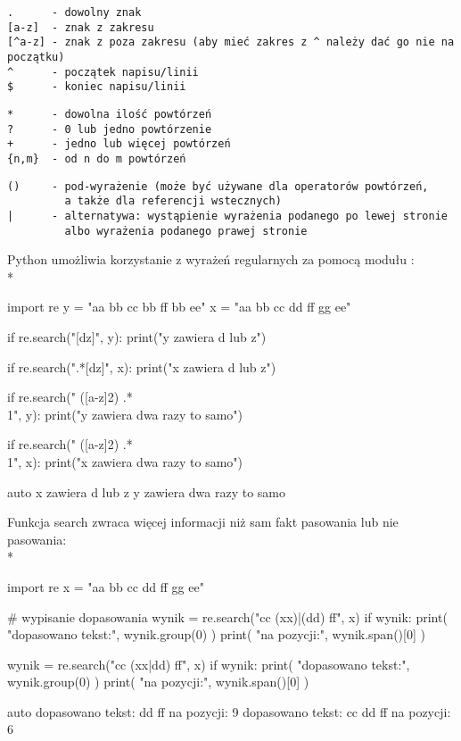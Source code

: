 \vspace{-6pt}\begin{Verbatim}
.      - dowolny znak
[a-z]  - znak z zakresu
[^a-z] - znak z poza zakresu (aby mieć zakres z ^ należy dać go nie na początku)
^      - początek napisu/linii
$      - koniec napisu/linii
\end{Verbatim}
\vspace{-8pt}\begin{Verbatim}
*      - dowolna ilość powtórzeń
?      - 0 lub jedno powtórzenie
+      - jedno lub więcej powtórzeń
{n,m}  - od n do m powtórzeń
\end{Verbatim}
\vspace{-8pt}\begin{Verbatim}
()     - pod-wyrażenie (może być używane dla operatorów powtórzeń,
         a także dla referencji wstecznych)
|      - alternatywa: wystąpienie wyrażenia podanego po lewej stronie
         albo wyrażenia podanego prawej stronie
\end{Verbatim}

\noindent
Python umożliwia korzystanie z wyrażeń regularnych za pomocą modułu :
\\*
\begin{CodeFrame}[python]{0.57\textwidth}
import re
y = "aa bb cc bb ff bb ee"
x = "aa bb cc dd ff gg ee"

if re.search("[dz]", y):
  print("y zawiera d lub z")

if re.search(".*[dz]", x):
  print("x zawiera d lub z")

if re.search(" ([a-z]{2}) .* \\1", y):
  print("y zawiera dwa razy to samo")

if re.search(" ([a-z]{2}) .* \\1", x):
  print("x zawiera dwa razy to samo")
\end{CodeFrame}
\begin{CodeFrame}{auto}
x zawiera d lub z
y zawiera dwa razy to samo
\end{CodeFrame}

\noindent
Funkcja search zwraca więcej informacji niż sam fakt pasowania lub nie pasowania:
\\*
\begin{CodeFrame}[python]{0.57\textwidth}
import re
x = "aa bb cc dd ff gg ee"

# wypisanie dopasowania
wynik = re.search("cc (xx)|(dd) ff", x)
if wynik:
  print( "dopasowano tekst:", wynik.group(0) )
  print( "na pozycji:", wynik.span()[0] )

wynik = re.search("cc (xx|dd) ff", x)
if wynik:
  print( "dopasowano tekst:", wynik.group(0) )
  print( "na pozycji:", wynik.span()[0] )
\end{CodeFrame}
\begin{CodeFrame}{auto}
dopasowano tekst: dd ff
na pozycji: 9
dopasowano tekst: cc dd ff
na pozycji: 6
\end{CodeFrame}

